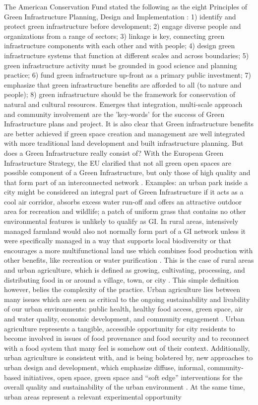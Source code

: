 \documentclass[10pt,a4paper]{article}
\begin{document}
\begin{multicols}{2}
The American Conservation Fund stated the following as the eight Principles of Green Infrastructure Planning, Design and Implementation \citep{r46, r47}: 1) identify and protect green infrastructure before development; 2) engage diverse people and organizations from a range of sectors; 3) linkage is key, connecting green infrastructure components with each other and with people; 4) design green infrastructure systems that function at different scales and across boundaries; 5) green infrastructure activity must be grounded in good science and planning practice; 6) fund green infrastructure up-front as a primary public investment; 7) emphasize that green infrastructure benefits are afforded to all (to nature and people); 8) green infrastructure should be the framework for conservation of natural and cultural resources. Emerges that integration, multi-scale approach and community involvement are the 'key-words' for the success of Green Infrastructure plans and project. It is also clear that Green infrastructure benefits are better achieved if green space creation and management are well integrated with more traditional land development and built infrastructure planning. But does a Green Infrastructure really consist of? With the European Green Infrastructure Strategy, the EU clarified that not all green open spaces are possible component of a Green Infrastructure, but only those of high quality and that form part of an interconnected network \citep{r48}. Examples: an urban park inside a city might be considered an integral part of Green Infrastructure if it acts as a cool air corridor, absorbs excess water run-off and offers an attractive outdoor area for recreation and wildlife; a patch of uniform grass that contains no other environmental features is unlikely to qualify as GI. In rural areas, intensively managed farmland would also not normally form part of a GI network unless it were specifically managed in a way that supports local biodiversity or that encourages a more multifunctional land use which combines food production with other benefits, like recreation or water purification \citep{r49}. This is the case of rural areas and urban agriculture, which is defined as growing, cultivating, processing, and distributing food in or around a village, town, or city \citep{r50, r51}. This simple definition however, belies the complexity of the practice. Urban agriculture lies between many issues which are seen as critical to the ongoing sustainability and livability of our urban environments: public health, healthy food access, green space, air and water quality, economic development, and community engagement \citep{r52}. Urban agriculture represents a tangible, accessible opportunity for city residents to become involved in issues of food provenance and food security and to reconnect with a food system that many feel is somehow out of their context. Additionally, urban agriculture is consistent with, and is being bolstered by, new approaches to urban design and development, which emphasize diffuse, informal, community-based initiatives, open space, green space and ``soft edge'' interventions for the overall quality and sustainability of the urban environment \citep{r53, r54, r55}. At the same time, urban areas represent a relevant experimental opportunity 
\end{multicols}
\end{document}
